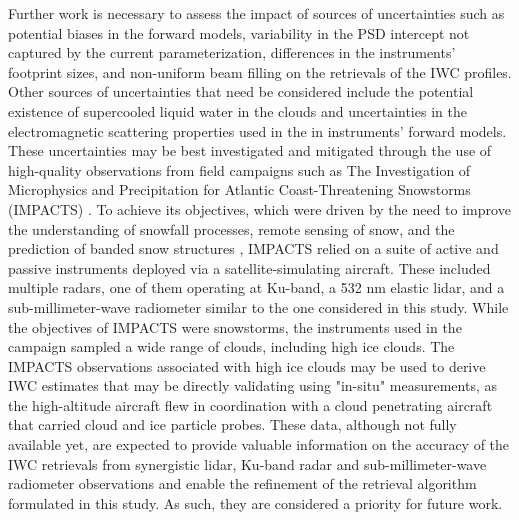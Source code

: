 \documentclass{ametsocV6.1}
\begin{document}
Further work is necessary to assess the impact of sources of uncertainties such as potential biases in the forward models, variability in the PSD intercept not captured by the current parameterization, differences in the instruments' footprint sizes, and non-uniform beam filling on the retrievals of the IWC profiles.  Other sources of uncertainties that need be considered include the potential existence of supercooled liquid water in the clouds and uncertainties in the electromagnetic scattering properties used in the in instruments' forward models. These uncertainties may be best investigated and mitigated through the use of high-quality observations from field campaigns such as The Investigation of Microphysics and Precipitation for Atlantic Coast-Threatening Snowstorms (IMPACTS) \citep{mcmurdie2022}. To achieve its objectives, which were driven by the need to improve the understanding of snowfall processes, remote sensing of snow, and the prediction of banded snow structures \citep{mcmurdie2022}, IMPACTS relied on a suite of active and passive instruments deployed via a satellite-simulating aircraft. These included multiple radars, one of them operating at Ku-band, a 532 nm elastic lidar, and a sub-millimeter-wave radiometer similar to the one considered in this study. While the objectives of IMPACTS were snowstorms, the instruments used in the campaign sampled a wide range of clouds, including high ice clouds.  The IMPACTS observations associated with high ice clouds may be used to derive IWC estimates that may be directly validating using "in-situ" measurements, as the high-altitude aircraft flew in coordination with a cloud penetrating aircraft that carried cloud and ice particle probes. These data, although not fully available yet, are expected to provide valuable information on the accuracy of the IWC retrievals from synergistic lidar, Ku-band radar and sub-millimeter-wave radiometer observations and enable the refinement of the retrieval algorithm formulated in this study. As such, they are considered a priority for future work.




\end{document}
